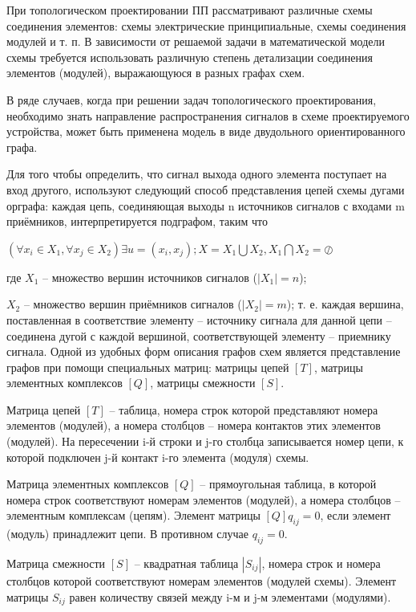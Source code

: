 \documentclass[a4paper,14pt]{article}
\begin{document}
При топологическом проектировании ПП рассматривают различные схемы соединения элементов: схемы электрические принципиальные, схемы соединения модулей и т. п. В зависимости от решаемой задачи в математической модели схемы требуется использовать различную степень детализации соединения элементов (модулей), выражающуюся в разных графах схем.

В ряде случаев, когда при решении задач топологического проектирования, необходимо знать направление распространения сигналов в схеме проектируемого устройства, может быть применена модель в виде двудольного ориентированного графа.

Для того чтобы определить, что сигнал выхода одного элемента поступает на вход другого, используют следующий способ представления цепей схемы дугами орграфа: каждая цепь, соединяющая выходы n источников сигналов с входами m приёмников, интерпретируется подграфом, таким что 

$(\forall x_i \in X_1, \forall x_j \in X_2) \exists u=(x_i, x_j); X = X_1\bigcup X_2, X_1\bigcap X_2 = \oslash$

где $X_1$ – множество вершин источников сигналов ($|X_1| = n$);

$X_2$ – множество вершин приёмников сигналов ($|X_2| = m$); т. е. каждая вершина, поставленная в соответствие элементу – источнику сигнала для данной цепи – соединена дугой с каждой вершиной, соответствующей элементу – приемнику сигнала. 
Одной из удобных форм описания графов схем является представление графов при помощи специальных матриц: матрицы цепей $[T]$, матрицы элементных комплексов $[Q]$, матрицы смежности $[S]$.

Матрица цепей $[T]$ – таблица, номера строк которой представляют номера элементов (модулей), а номера столбцов – номера контактов этих элементов (модулей). На пересечении i-й строки и j-го столбца записывается номер цепи, к которой подключен j-й контакт i-го элемента (модуля) схемы.

Матрица элементных комплексов $[Q]$ – прямоугольная таблица, в которой номера строк соответствуют номерам элементов (модулей), а номера столбцов – элементным комплексам (цепям). Элемент матрицы $[Q] q_{ij} = 0$, если элемент (модуль) принадлежит цепи. В противном случае $q_{ij} = 0$.

Матрица смежности $[S]$ – квадратная таблица $|S_{ij}|$, номера строк и номера столбцов которой соответствуют номерам элементов (модулей схемы). Элемент матрицы $S_{ij}$ равен количеству связей между i-м и j-м элементами (модулями).
\end{document}
